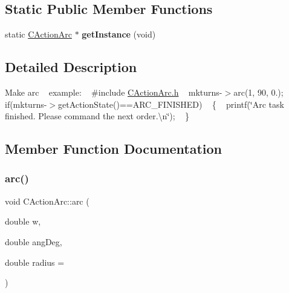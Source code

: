 \subsection*{Static Public Member Functions}
\begin{DoxyCompactItemize}
\item 
\mbox{\label{classmotion_1_1CActionArc_a058d43888af190cf93dc3130746d9e9e}} 
static \mbox{\hyperlink{classmotion_1_1CActionArc}{C\+Action\+Arc}} $\ast$ {\bfseries get\+Instance} (void)
\end{DoxyCompactItemize}


\subsection{Detailed Description}
Make arc ~\newline
 example\+: ~\newline
 \#include \mbox{\hyperlink{CActionArc_8h}{C\+Action\+Arc.\+h}} ~\newline
 mkturns-\/$>$arc(1, 90, 0.); ~\newline
if(mkturns-\/$>$get\+Action\+State()==A\+R\+C\+\_\+\+F\+I\+N\+I\+S\+H\+ED) ~\newline
\{ ~\newline
 printf(\char`\"{}\+Arc task finished. Please command the next order.\textbackslash{}n\char`\"{}); ~\newline
\} 

\subsection{Member Function Documentation}
\mbox{\label{classmotion_1_1CActionArc_a64a6fc339df29d196786291f02b2802e}} 
\subsubsection{\texorpdfstring{arc()}{arc()}}
{\footnotesize\ttfamily void C\+Action\+Arc\+::arc (\begin{DoxyParamCaption}\item[{double}]{w,  }\item[{double}]{ang\+Deg,  }\item[{double}]{radius = {} }\end{DoxyParamCaption})}


